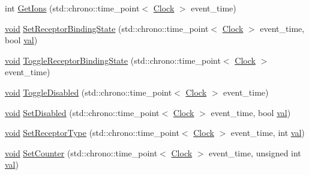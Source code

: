 \begin{DoxyCompactItemize}
\item 
int \mbox{\hyperlink{class_neuroreceptor_a69103180d9b335b9504b4ae3c203d0ea}{Get\+Ions}} (std\+::chrono\+::time\+\_\+point$<$ \mbox{\hyperlink{universe_8h_a0ef8d951d1ca5ab3cfaf7ab4c7a6fd80}{Clock}} $>$ event\+\_\+time)
\item 
\mbox{\hyperlink{glad_8h_a950fc91edb4504f62f1c577bf4727c29}{void}} \mbox{\hyperlink{class_neuroreceptor_a75adddd7e615af57b8f3f841ec25463c}{Set\+Receptor\+Binding\+State}} (std\+::chrono\+::time\+\_\+point$<$ \mbox{\hyperlink{universe_8h_a0ef8d951d1ca5ab3cfaf7ab4c7a6fd80}{Clock}} $>$ event\+\_\+time, bool \mbox{\hyperlink{glad_8h_a26942fd2ed566ef553eae82d2c109c8f}{val}})
\item 
\mbox{\hyperlink{glad_8h_a950fc91edb4504f62f1c577bf4727c29}{void}} \mbox{\hyperlink{class_neuroreceptor_ace41227d30a8f50e1a6efadc86573f80}{Toggle\+Receptor\+Binding\+State}} (std\+::chrono\+::time\+\_\+point$<$ \mbox{\hyperlink{universe_8h_a0ef8d951d1ca5ab3cfaf7ab4c7a6fd80}{Clock}} $>$ event\+\_\+time)
\item 
\mbox{\hyperlink{glad_8h_a950fc91edb4504f62f1c577bf4727c29}{void}} \mbox{\hyperlink{class_neuroreceptor_a8a339a4d0f150bbdfbc2650155625196}{Toggle\+Disabled}} (std\+::chrono\+::time\+\_\+point$<$ \mbox{\hyperlink{universe_8h_a0ef8d951d1ca5ab3cfaf7ab4c7a6fd80}{Clock}} $>$ event\+\_\+time)
\item 
\mbox{\hyperlink{glad_8h_a950fc91edb4504f62f1c577bf4727c29}{void}} \mbox{\hyperlink{class_neuroreceptor_aeec8bb2442e04700d4e9d80bb2d6e47e}{Set\+Disabled}} (std\+::chrono\+::time\+\_\+point$<$ \mbox{\hyperlink{universe_8h_a0ef8d951d1ca5ab3cfaf7ab4c7a6fd80}{Clock}} $>$ event\+\_\+time, bool \mbox{\hyperlink{glad_8h_a26942fd2ed566ef553eae82d2c109c8f}{val}})
\item 
\mbox{\hyperlink{glad_8h_a950fc91edb4504f62f1c577bf4727c29}{void}} \mbox{\hyperlink{class_neuroreceptor_a0e6e88d6c5b357872f055edbddb54d4c}{Set\+Receptor\+Type}} (std\+::chrono\+::time\+\_\+point$<$ \mbox{\hyperlink{universe_8h_a0ef8d951d1ca5ab3cfaf7ab4c7a6fd80}{Clock}} $>$ event\+\_\+time, int \mbox{\hyperlink{glad_8h_a26942fd2ed566ef553eae82d2c109c8f}{val}})
\item 
\mbox{\hyperlink{glad_8h_a950fc91edb4504f62f1c577bf4727c29}{void}} \mbox{\hyperlink{class_neuroreceptor_a0660a316ef44cf723509f720acd16f24}{Set\+Counter}} (std\+::chrono\+::time\+\_\+point$<$ \mbox{\hyperlink{universe_8h_a0ef8d951d1ca5ab3cfaf7ab4c7a6fd80}{Clock}} $>$ event\+\_\+time, unsigned int \mbox{\hyperlink{glad_8h_a26942fd2ed566ef553eae82d2c109c8f}{val}})
\item 

\end{DoxyCompactItemize}
